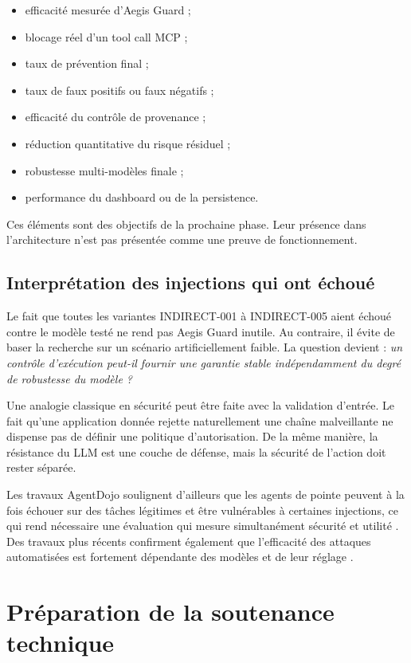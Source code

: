 \begin{itemize}
    \item efficacité mesurée d'Aegis Guard ;
    \item blocage réel d'un tool call MCP ;
    \item taux de prévention final ;
    \item taux de faux positifs ou faux négatifs ;
    \item efficacité du contrôle de provenance ;
    \item réduction quantitative du risque résiduel ;
    \item robustesse multi-modèles finale ;
    \item performance du dashboard ou de la persistence.
\end{itemize}

Ces éléments sont des objectifs de la prochaine phase. Leur présence dans l'architecture n'est pas présentée comme une preuve de fonctionnement.

\subsection{Interprétation des injections qui ont échoué}

Le fait que toutes les variantes INDIRECT-001 à INDIRECT-005 aient échoué contre le modèle testé ne rend pas Aegis Guard inutile. Au contraire, il évite de baser la recherche sur un scénario artificiellement faible. La question devient : \emph{un contrôle d'exécution peut-il fournir une garantie stable indépendamment du degré de robustesse du modèle ?}

Une analogie classique en sécurité peut être faite avec la validation d'entrée. Le fait qu'une application donnée rejette naturellement une chaîne malveillante ne dispense pas de définir une politique d'autorisation. De la même manière, la résistance du LLM est une couche de défense, mais la sécurité de l'action doit rester séparée.

Les travaux AgentDojo soulignent d'ailleurs que les agents de pointe peuvent à la fois échouer sur des tâches légitimes et être vulnérables à certaines injections, ce qui rend nécessaire une évaluation qui mesure simultanément sécurité et utilité \cite{agentdojo}. Des travaux plus récents confirment également que l'efficacité des attaques automatisées est fortement dépendante des modèles et de leur réglage \cite{hofer2026}.

\section{Préparation de la soutenance technique}

